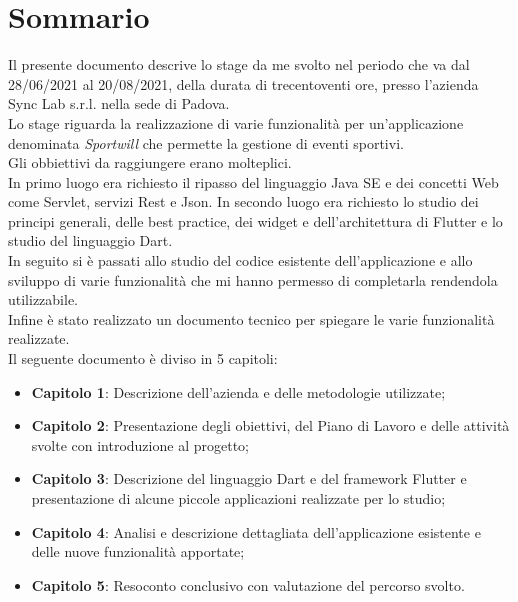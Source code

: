 
\cleardoublepage
{}
{}
\begingroup
\let\clearpage\relax
\let\cleardoublepage\relax
\let\cleardoublepage\relax

\chapter*{Sommario}

Il presente documento descrive lo stage da me svolto nel periodo che va dal 28/06/2021 al 20/08/2021, della durata di trecentoventi ore, presso l'azienda Sync Lab s.r.l. nella sede di Padova.\\
Lo stage riguarda la realizzazione di varie funzionalità per un'applicazione denominata \textit{Sportwill} che permette la gestione di eventi sportivi.\\
Gli obbiettivi da raggiungere erano molteplici.\\
In primo luogo era richiesto il ripasso del linguaggio Java SE e dei concetti Web come Servlet, servizi Rest e Json.
In secondo luogo era richiesto lo studio dei principi generali, delle best practice, dei widget e dell'architettura di Flutter e lo studio del linguaggio Dart.\\
In seguito si è passati allo studio del codice esistente dell'applicazione e allo sviluppo di varie funzionalità che mi hanno permesso di completarla rendendola utilizzabile.\\
Infine è stato realizzato un documento tecnico per spiegare le varie funzionalità realizzate.\\
Il seguente documento è diviso in 5 capitoli:
\begin{itemize}
	\item \textbf{Capitolo 1}: Descrizione dell'azienda e delle metodologie utilizzate; \\
	\item \textbf{Capitolo 2}: Presentazione degli obiettivi, del Piano di Lavoro e delle attività svolte con introduzione al progetto; \\
	\item \textbf{Capitolo 3}: Descrizione del linguaggio Dart e del framework Flutter e presentazione di alcune piccole applicazioni realizzate per lo studio; \\
	\item \textbf{Capitolo 4}: Analisi e descrizione dettagliata dell'applicazione esistente e delle nuove funzionalità apportate; \\
	\item \textbf{Capitolo 5}: Resoconto conclusivo con valutazione del percorso svolto. \\
\end{itemize}

%
%

\endgroup			

\vfill

